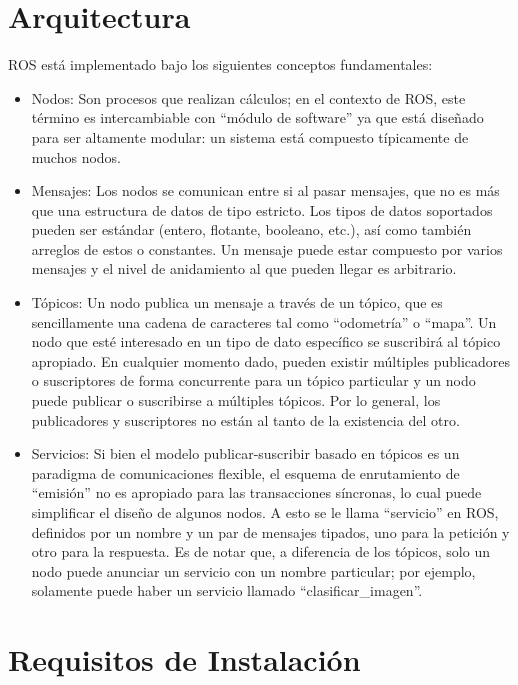 \section{Arquitectura}

ROS está implementado bajo los siguientes conceptos fundamentales:

\begin{itemize}
	\itemsep1pt \parskip1pt 
	\item Nodos: Son procesos que realizan cálculos; en el contexto de ROS, este término es intercambiable con ``módulo de software'' ya que está diseñado para ser altamente modular: un sistema está compuesto típicamente de muchos nodos.
	\item Mensajes:	Los nodos se comunican entre si al pasar mensajes, que no es más que una estructura de datos de tipo estricto. Los tipos de datos soportados pueden ser estándar (entero, flotante, booleano, etc.), así como también arreglos de estos o constantes. Un mensaje puede estar compuesto por varios mensajes y el nivel de anidamiento al que pueden llegar es arbitrario.
	\item Tópicos: Un nodo publica un mensaje a través de un tópico, que es sencillamente una cadena de caracteres tal como ``odometría'' o ``mapa''. Un nodo que esté interesado en un tipo de dato específico se suscribirá al tópico apropiado. En cualquier momento dado, pueden existir múltiples publicadores o suscriptores de forma concurrente para un tópico particular y un nodo puede publicar o suscribirse a múltiples tópicos. Por lo general, los publicadores y suscriptores no están al tanto de la existencia del otro.
	\item Servicios: Si bien el modelo publicar-suscribir basado en tópicos es un paradigma de comunicaciones flexible, el esquema de enrutamiento de ``emisión'' no es apropiado para las transacciones síncronas, lo cual puede simplificar el diseño de algunos nodos. A esto se le llama ``servicio'' en ROS, definidos por un nombre y un par de mensajes tipados, uno para la petición y otro para la respuesta. Es de notar que, a diferencia de los tópicos, solo un nodo puede anunciar un servicio con un nombre particular; por ejemplo, solamente puede haber un servicio llamado ``clasificar\_imagen''. \cite{quigley2009ros}
\end{itemize}

\section{Requisitos de Instalación}


